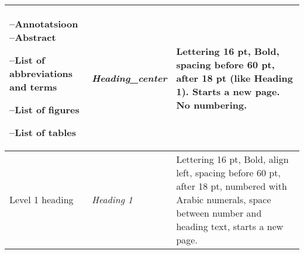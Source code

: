 \begin{table}[ht]
\begin{tabular}{|L{3.7cm}|L{3.0cm}|L{7.2cm}|}
    --Annotatsioon
    --Abstract

    --List of abbreviations
    and terms

    --List of figures

    --List of tables & \textit{Heading\_center}& Lettering 16 pt, Bold, spacing before 60 pt,
                                                 after 18 pt (like Heading 1). Starts a new page.
                                                 No numbering. \\ \hline
    Level 1 heading & \textit{Heading 1} & Lettering 16 pt, Bold, align left, spacing before 60 pt, after 18 pt, numbered with Arabic
                                           numerals, space between number and heading
                                           text, starts a new page.
    \\ \hline
  \end{tabular}
\end{table}

